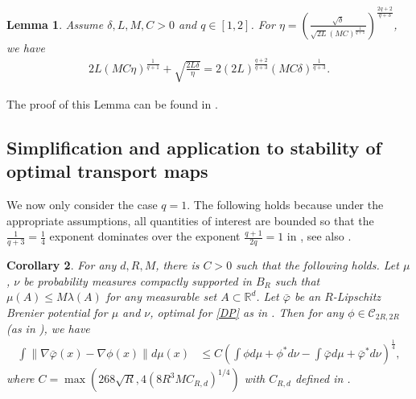 \documentclass[11pt]{article}
\newtheorem{lemma}{Lemma}[section]
\newtheorem{corollary}[lemma]{Corollary}
\newcommand{\RR}{\mathbb{R}}
\newcommand{\1}{\mathbbm{1}}
\numberwithin{equation}{section}
\begin{document}
\begin{lemma}
    Assume $\delta,L,M,C > 0$ and $q \in [1,2]$.
	For $\eta = \left(\frac{\sqrt{\delta}}{\sqrt{2L} (M C)^{\frac{1}{q+1}}}\right)^{\frac{2q + 2}{q+3}}$, we have
	\begin{align*}
		2 L( M C\eta)^{\frac{1}{q+1}} + \sqrt{\frac{2L\delta}{\eta}} = 2 (2L)^{\frac{q+2}{q+3}} (MC\delta)^{\frac{1}{q+3}}.
	\end{align*}
	\label{lem:technicalComputation}
\end{lemma}
The proof of this Lemma can be found in .




\subsection{Simplification and application to stability of optimal transport maps}
We now only consider the case $q=1$. The following holds because under the appropriate assumptions, all quantities of interest are bounded so that the $\frac{1}{q+3} = \frac{1}{4}$ exponent dominates over the exponent $\frac{q+1}{2q} = 1$ in , see also .
\begin{corollary}
For any $d,R,M$, there is $C>0$ such that the following holds. Let $\mu$, $\nu$ be probability measures compactly supported in $B_R$ such that $\mu(A) \leq M \lambda(A)$ for any measurable set $A \subset \RR^d$. Let $\bar{\varphi}$ be an $R$-Lipschitz Brenier potential for $\mu$ and $\nu$, optimal for \eqref{DP} as in .  Then  for any $\phi \in \mathcal{C}_{2R,2R}$ (as in ), we have
    \begin{align*}
       \int \| \nabla \bar{\varphi}(x) - \nabla \phi(x)\| d\mu(x) &\leq C\left(\int \phi d\mu + \phi^*d\nu - \int \bar{\varphi} d \mu + \bar{\varphi}^* d\nu\right)^{\frac{1}{4}},
    \end{align*}
    where $C= \max\left(268\sqrt{R}, 4(8R^3MC_{R,d})^{1/4}\right)$ with $C_{R,d}$ defined in . 
    \label{cor:simplerForm}
\end{corollary}
\end{document}
